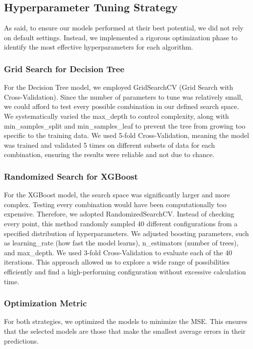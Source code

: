 \documentclass[a4paper,12pt]{article}
\begin{document}
\subsection{Hyperparameter Tuning Strategy}
As said, to ensure our models performed at their best potential, we did not rely on default settings. Instead, we implemented a rigorous optimization phase to identify the most effective hyperparameters for each algorithm.

\subsubsection{Grid Search for Decision Tree}
For the Decision Tree model, we employed GridSearchCV (Grid Search with Cross-Validation). Since the number of parameters to tune was relatively small, we could afford to test every possible combination in our defined search space. We systematically varied the max\_depth to control complexity, along with min\_samples\_split and min\_samples\_leaf to prevent the tree from growing too specific to the training data. We used 5-fold Cross-Validation, meaning the model was trained and validated 5 times on different subsets of data for each combination, ensuring the results were reliable and not due to chance.

\subsubsection{Randomized Search for XGBoost}
For the XGBoost model, the search space was significantly larger and more complex. Testing every combination would have been computationally too expensive. Therefore, we adopted RandomizedSearchCV. Instead of checking every point, this method randomly sampled 40 different configurations from a specified distribution of hyperparameters. We adjusted boosting parameters, such as learning\_rate (how fast the model learns), n\_estimators (number of trees), and max\_depth. We used 3-fold Cross-Validation to evaluate each of the 40 iterations. This approach allowed us to explore a wide range of possibilities efficiently and find a high-performing configuration without excessive calculation time.

\subsubsection{Optimization Metric}
For both strategies, we optimized the models to minimize the MSE. This ensures that the selected models are those that make the smallest average errors in their predictions.
\end{document}
